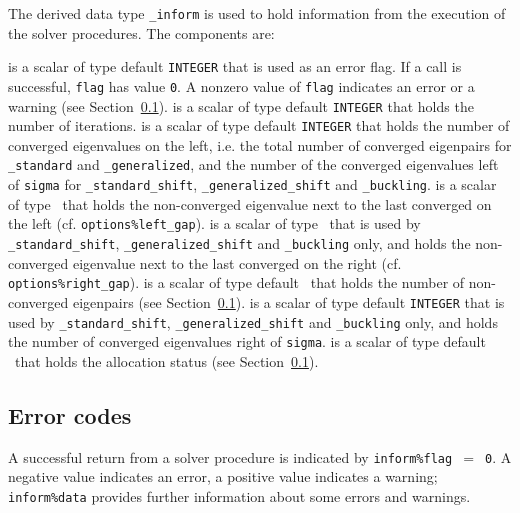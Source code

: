 \documentclass{spral}
\begin{document}
The derived data type {\tt \solver\_inform} is used
to hold information from the execution of
the solver procedures.
The components are:

\begin{description}
%
 is a scalar of type default {\tt INTEGER} 
that is used as an error flag.
If a call is successful, {\tt flag} has value {\tt 0}.
A nonzero value of {\tt flag} indicates an error or a warning
(see Section~\ref{sec:err}).
%
 is a scalar of type default {\tt INTEGER} that holds 
the number of iterations.
%
is a scalar of type default {\tt INTEGER} that holds
the number of converged eigenvalues on the left,
i.e. the total number of converged eigenpairs for 
{\tt \solver\_standard} and {\tt \solver\_generalized},
and the number of the converged eigenvalues left of {\tt sigma}
for {\tt \solver\_standard\_shift}, {\tt \solver\_generalized\_shift}
and {\tt \solver\_buckling}.
%
is a scalar of type \REALDP\ that holds
the non-converged eigenvalue next to the last converged on the left
(cf. {\tt options\%left\_gap}).
%
is a scalar of type \REALDP\ that is used by
{\tt \solver\_standard\_shift}, {\tt \solver\_generalized\_shift}
and {\tt \solver\_buckling} only, and holds
the non-converged eigenvalue next to the last converged on the right
(cf. {\tt options\%right\_gap}).
%
is a scalar of type default \Integer\ 
that holds the number of non-converged eigenpairs
(see Section~\ref{sec:err}).
%
is a scalar of type default {\tt INTEGER} that is used by 
{\tt \solver\_standard\_shift}, {\tt \solver\_generalized\_shift}
and {\tt \solver\_buckling} only, and holds
the number of converged eigenvalues right of {\tt sigma}.
%
is a scalar of type default \Integer\ 
that holds the allocation status
(see Section~\ref{sec:err}).
%
\end{description}

\subsection{Error codes}

\label{sec:err}

A successful return from 
a solver procedure
is indicated 
by {\tt inform\%flag $=$ 0}.
A negative value indicates an error, a positive value indicates a warning;
{\tt inform\%data} provides further information
about some errors and warnings. 
\end{document}
